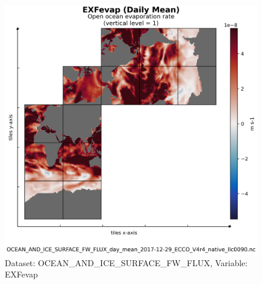 \begin{figure}[H]
\centering
\includegraphics[scale=0.55]{../images/plots/v4r4/native_plots/Ocean_and_Sea-Ice_Surface_Freshwater_Fluxes/EXFevap.png}
\caption{Dataset: OCEAN\_AND\_ICE\_SURFACE\_FW\_FLUX, Variable: EXFevap}
\label{tab:table-OCEAN_AND_ICE_SURFACE_FW_FLUX_EXFevap-Plot}
\end{figure}
\newpage
\pagebreak
